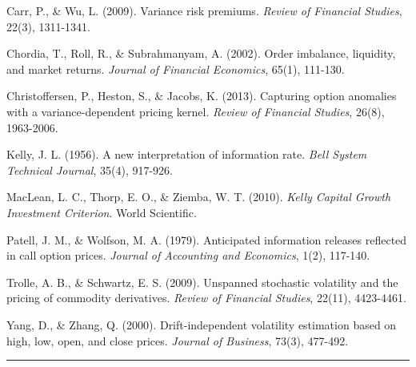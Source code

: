 \documentclass[
  american,
  11pt,
  11pt,
  letterpaper,
  onecolumn]{article}
\begin{document}
Carr, P., \& Wu, L. (2009). Variance risk premiums. \emph{Review of
Financial Studies}, 22(3), 1311-1341.

Chordia, T., Roll, R., \& Subrahmanyam, A. (2002). Order imbalance,
liquidity, and market returns. \emph{Journal of Financial Economics},
65(1), 111-130.

Christoffersen, P., Heston, S., \& Jacobs, K. (2013). Capturing option
anomalies with a variance-dependent pricing kernel. \emph{Review of
Financial Studies}, 26(8), 1963-2006.

Kelly, J. L. (1956). A new interpretation of information rate.
\emph{Bell System Technical Journal}, 35(4), 917-926.

MacLean, L. C., Thorp, E. O., \& Ziemba, W. T. (2010). \emph{Kelly
Capital Growth Investment Criterion}. World Scientific.

Patell, J. M., \& Wolfson, M. A. (1979). Anticipated information
releases reflected in call option prices. \emph{Journal of Accounting
and Economics}, 1(2), 117-140.

Trolle, A. B., \& Schwartz, E. S. (2009). Unspanned stochastic
volatility and the pricing of commodity derivatives. \emph{Review of
Financial Studies}, 22(11), 4423-4461.

Yang, D., \& Zhang, Q. (2000). Drift-independent volatility estimation
based on high, low, open, and close prices. \emph{Journal of Business},
73(3), 477-492.

\begin{center}\rule{0.5\linewidth}{0.5pt}\end{center}


\printbibliography
\end{document}
